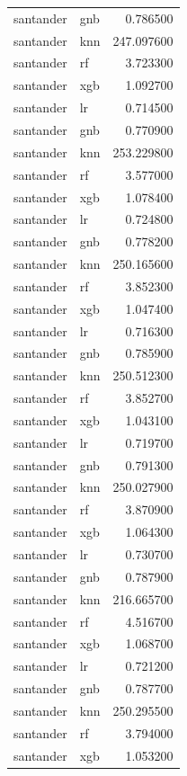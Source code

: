 \begin{longtable}{llr}
santander & gnb & 0.786500 \\
santander & knn & 247.097600 \\
santander & rf & 3.723300 \\
santander & xgb & 1.092700 \\
santander & lr & 0.714500 \\
santander & gnb & 0.770900 \\
santander & knn & 253.229800 \\
santander & rf & 3.577000 \\
santander & xgb & 1.078400 \\
santander & lr & 0.724800 \\
santander & gnb & 0.778200 \\
santander & knn & 250.165600 \\
santander & rf & 3.852300 \\
santander & xgb & 1.047400 \\
santander & lr & 0.716300 \\
santander & gnb & 0.785900 \\
santander & knn & 250.512300 \\
santander & rf & 3.852700 \\
santander & xgb & 1.043100 \\
santander & lr & 0.719700 \\
santander & gnb & 0.791300 \\
santander & knn & 250.027900 \\
santander & rf & 3.870900 \\
santander & xgb & 1.064300 \\
santander & lr & 0.730700 \\
santander & gnb & 0.787900 \\
santander & knn & 216.665700 \\
santander & rf & 4.516700 \\
santander & xgb & 1.068700 \\
santander & lr & 0.721200 \\
santander & gnb & 0.787700 \\
santander & knn & 250.295500 \\
santander & rf & 3.794000 \\
santander & xgb & 1.053200 \\
\end{longtable}\endgroup

